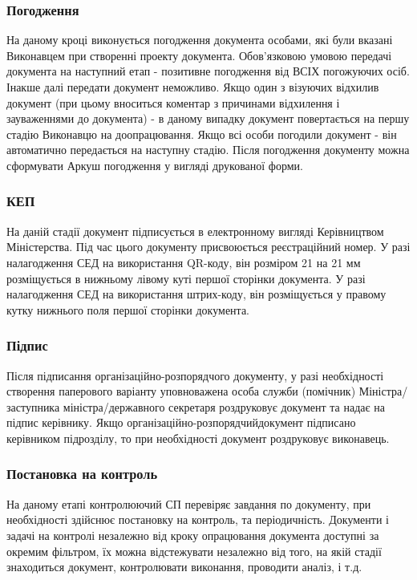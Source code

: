 \subsubsection*{Погодження}

На даному кроці виконується погодження документа особами, які були вказані
Виконавцем при створенні проекту документа.
Обов'язковою умовою передачі документа на наступний етап - позитивне погодження
від ВСІХ погожуючих осіб. Інакше далі передати документ неможливо. Якщо один
з візуючих відхилив документ (при цьому вноситься коментар з причинами
відхилення і зауваженнями до документа) - в даному випадку документ
повертається на першу стадію Виконавцю на доопрацювання.
Якщо всі особи погодили документ - він автоматично передається на наступну стадію.
Після погодження документу можна сформувати Аркуш погодження у вигляді друкованої форми.

\subsubsection*{КЕП}

На даній стадії документ підписується в електронному вигляді Керівництвом Міністерства.
Під час цього документу присвоюється реєстраційний номер.
У разі налагодження СЕД на використання QR-коду, він розміром
21 на 21 мм розміщується в нижньому лівому куті першої сторінки документа.
У разі налагодження СЕД на використання штрих-коду, він розміщується у правому кутку нижнього поля першої сторінки документа.

\subsubsection*{Підпис}

Після підписання організаційно-розпорядчого документу, у разі
необхідності створення паперового варіанту уповноважена особа
служби (помічник) Міністра/заступника міністра/державного секретаря
роздруковує документ та надає на підпис керівнику.
Якщо організаційно-розпорядчийдокумент підписано керівником
підрозділу, то при необхідності документ роздруковує виконавець.

\subsubsection*{Постановка на контроль}

На даному етапі контролюючий СП перевіряє завдання по документу,
при необхідності здійснює постановку на контроль, та періодичність.
Документи і задачі на контролі незалежно від кроку опрацювання
документа доступні за окремим фільтром, їх можна відстежувати
незалежно від того, на якій стадії знаходиться документ,
контролювати виконання, проводити аналіз, і т.д.


